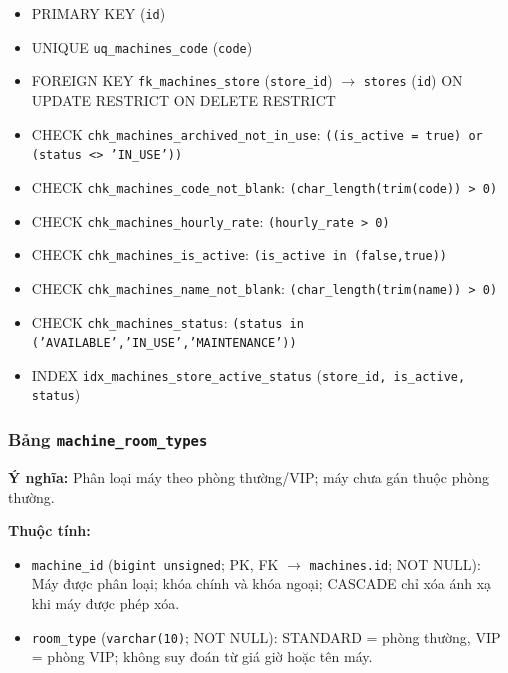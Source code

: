 \begin{itemize}

\item PRIMARY KEY (\texttt{id})

\item UNIQUE \texttt{uq\_machines\_code} (\texttt{code})

\item FOREIGN KEY \texttt{fk\_machines\_store} (\texttt{store\_id}) $\rightarrow$ \texttt{stores} (\texttt{id}) ON UPDATE RESTRICT ON DELETE RESTRICT

\item CHECK \texttt{chk\_machines\_archived\_not\_in\_use}: \texttt{((is\_active = true) or (status <> 'IN\_USE'))}

\item CHECK \texttt{chk\_machines\_code\_not\_blank}: \texttt{(char\_length(trim(code)) > 0)}

\item CHECK \texttt{chk\_machines\_hourly\_rate}: \texttt{(hourly\_rate > 0)}

\item CHECK \texttt{chk\_machines\_is\_active}: \texttt{(is\_active in (false,true))}

\item CHECK \texttt{chk\_machines\_name\_not\_blank}: \texttt{(char\_length(trim(name)) > 0)}

\item CHECK \texttt{chk\_machines\_status}: \texttt{(status in ('AVAILABLE','IN\_USE','MAINTENANCE'))}

\item INDEX \texttt{idx\_machines\_store\_active\_status} (\texttt{store\_id, is\_active, status})

\end{itemize}

\subsubsection{Bảng \texttt{machine\_room\_types}}

\textbf{Ý nghĩa:} Phân loại máy theo phòng thường/VIP; máy chưa gán thuộc phòng thường.\par

\textbf{Thuộc tính:}

\begin{itemize}

\item \texttt{machine\_id} (\texttt{bigint unsigned}; PK, FK $\rightarrow$ \texttt{machines.id}; NOT NULL): Máy được phân loại; khóa chính và khóa ngoại; CASCADE chỉ xóa ánh xạ khi máy được phép xóa.

\item \texttt{room\_type} (\texttt{varchar(10)}; NOT NULL): STANDARD = phòng thường, VIP = phòng VIP; không suy đoán từ giá giờ hoặc tên máy.

\end{itemize}

